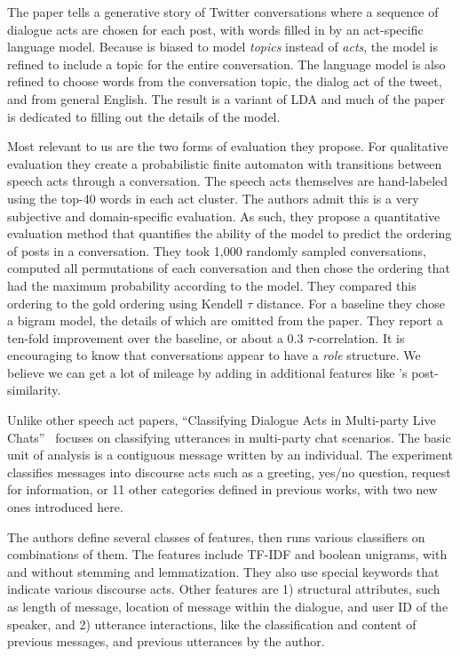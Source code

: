 \documentclass[11pt]{article}
\newcommand{\titlecite}[2]{``#1''~\cite{#2}}
\begin{document}
The paper tells a generative story of Twitter conversations where a sequence of dialogue
acts are chosen for each post, with words filled in by an act-specific language model.
Because is biased to model \textit{topics}
instead of \textit{acts}, the model is refined to include a topic 
for the entire conversation. The language model is also refined to choose words from
the conversation topic, the dialog act of the tweet, and from general English. The result
is a variant of LDA and much of the paper is dedicated to filling out the details of the model.

Most relevant to us are the two forms of evaluation they propose. For
qualitative evaluation they create a probabilistic finite automaton with
transitions between speech acts through a conversation. The speech acts
themselves are hand-labeled using the top-40 words in each act cluster. The 
authors admit this is a very subjective and domain-specific evaluation. As such,
they propose a quantitative evaluation method that quantifies the ability of
the model to predict the ordering of posts in a conversation. They took
1,000 randomly sampled conversations, computed all permutations
of each conversation and then chose the ordering that had the maximum
probability according to the model. They compared this ordering to the gold
ordering using Kendell $\tau$ distance. For a baseline they chose a bigram
model, the details of which are omitted from the paper. They report a ten-fold improvement
over the baseline, or about a 0.3 $\tau$-correlation. It is encouraging to know
that conversations appear to have a \textit{role} structure. We believe we can get a lot of mileage
by adding in additional features like \cite{Wang2008a}'s post-similarity.

Unlike other speech act papers, \titlecite{Classifying Dialogue Acts in Multi-party Live Chats}{Kim2012} 
focuses on classifying utterances
in multi-party chat scenarios. The basic unit
of analysis is a contiguous message written by an individual. The
experiment classifies messages into discourse acts such as a greeting, yes/no
question, request for information, or 11 other categories defined in previous
works, with two new ones introduced here.

The authors define several classes of features, then runs various classifiers on
combinations of them. The features include TF-IDF and boolean unigrams, with
and without stemming and lemmatization. They also use special keywords 
that indicate various discourse acts. Other
features are 1) structural attributes, such as length of message, location of
message within the dialogue, and user ID of the speaker, and 2) utterance
interactions, like the classification and content of previous messages, and
previous utterances by the author.
\end{document}

